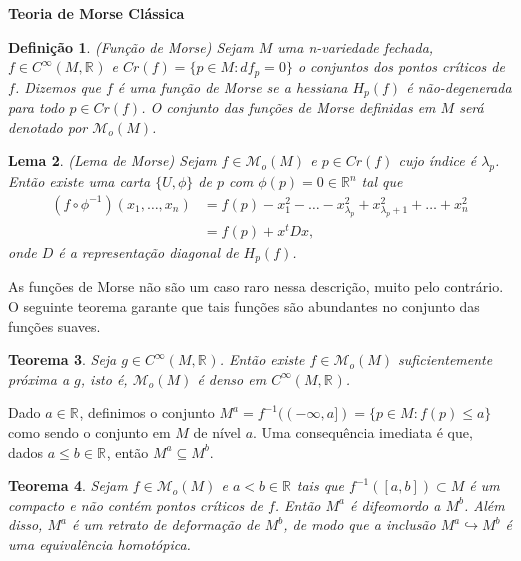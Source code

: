 \documentclass{beamer}
\newcommand{\titulo}[1]{\centering \textbf{#1}}
\newtheorem{teorema}{Teorema}[section]
\newtheorem{lema}[teorema]{Lema}
\newtheorem{definicao}[teorema]{Definição}
\newcommand{\funcoesmorse}[1]{\mathcal{M}_{o}(#1)}
\newcommand{\funcoessuaves}[1]{C^{\infty}(#1, \real{})}
\newcommand{\pontoscriticos}[1]{\textit{Cr}(#1)}
\newcommand{\real}[1]{\mathbb{R}^{#1}}
\newcommand{\reta}{\real{}}
\begin{document}
\begin{frame}
	\titulo{Teoria de Morse Clássica}
	\begin{definicao}
		(Função de Morse) Sejam $M$ uma n-variedade fechada, $f \in \funcoessuaves{M}$ e $\pontoscriticos{f} = \{p \in M: df_{p} = 0\}$ o conjuntos dos pontos críticos de $f$. Dizemos que $f$ é uma função de Morse se a hessiana $H_{p}(f)$ é não-degenerada para todo $p \in \pontoscriticos{f}$. O conjunto das funções de Morse definidas em $M$ será denotado por $\funcoesmorse{M}$. 
	\end{definicao}
	\begin{lema}
		(Lema de Morse) Sejam $f \in \funcoesmorse{M}$ e $p \in \pontoscriticos{f}$ cujo índice é $\lambda_{p}$. Então existe uma carta $\{U, \phi\}$ de $p$ com $\phi(p)=0 \in \real{n}$ tal que 
		$$
		\begin{aligned}
		(f\circ \phi^{-1})(x_{1}, \dots, x_{n}) &= f(p)-x_{1}^{2}-\dots -x^{2}_{\lambda_{p}}+x^{2}_{\lambda_{p}+1}+\dots + x^{2}_{n}
		\\
		&=f(p)+x^{t}Dx,
		\end{aligned}
		$$
		onde $D$ é a representação diagonal de $H_{p}(f)$.
	\end{lema}
\end{frame}

\begin{frame}
	As funções de Morse não são um caso raro nessa descrição, muito pelo contrário. O seguinte teorema garante que tais funções são abundantes no conjunto das funções suaves.
	\begin{teorema}
		Seja $g\in \funcoessuaves{M}$. Então existe $f \in \funcoesmorse{M}$ suficientemente próxima a $g$, isto é, $\funcoesmorse{M}$ é denso em $\funcoessuaves{M}$.
	\end{teorema}
\end{frame}
	
\begin{frame}
	Dado $a \in \reta$, definimos o conjunto $M^{a}= f^{-1}((-\infty, a]) = \{p \in M: f(p)\leq a\}$ como sendo o conjunto em $M$ de nível $a$. Uma consequência imediata é que, dados $a\leq b \in \reta$, então $M^{a} \subseteq M^{b}$.
	
	\begin{teorema}
		Sejam $f \in \funcoesmorse{M}$ e $a<b \in \reta$ tais que $f^{-1}([a,b])\subset M$ é um compacto e não contém pontos críticos de $f$. Então $M^{a}$ é difeomordo a $M^{b}$. Além disso, $M^{a}$ é um retrato de deformação de $M^{b}$, de modo que a inclusão  $M^{a} \hookrightarrow M^{b}$ é uma equivalência homotópica.
	\end{teorema}
	
\end{frame}
\end{document}
